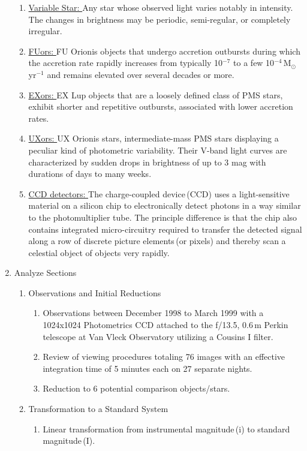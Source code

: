 \documentclass[twocolumn]{aastex6}
\begin{document}
\begin{enumerate}
\begin{enumerate}
		    \item \underline{Variable Star: } Any star whose observed light varies notably in intensity. The changes in brightness may be periodic, semi-regular, or completely irregular.
		    \item \underline{FUors: } FU Orionis objects that undergo accretion outbursts during which the accretion rate rapidly increases from typically 10$^{-7}$ to a few 10$^{-4}$\,M$_{\odot}$yr$^{-1}$ and remains elevated over several decades or more.\,\cite{2}
		    \item \underline{EXors: } EX Lup objects that are a loosely defined class of PMS stars, exhibit shorter and repetitive outbursts, associated with lower accretion rates.\,\cite{2}
		    \item \underline{UXors: } UX Orionis stars, intermediate-mass PMS stars displaying a peculiar kind of photometric variability. Their V-band light curves are characterized by sudden drops in brightness of up to 3 mag with durations of days to many weeks.\,\cite{1}
		    \item \underline{CCD detectors: } The charge-coupled device\,(CCD) uses a light-sensitive material on a silicon chip to electronically detect photons in a way similar to the photomultiplier tube. The principle difference is that the chip also contains integrated micro-circuitry required to transfer the detected signal along a row of discrete picture elements\,(or pixels) and thereby scan a celestial object of objects very rapidly.
		\end{enumerate}	
	\item Analyze Sections
		\begin{enumerate}
			\item Observations and Initial Reductions
				\begin{enumerate}
					\item Observations between December 1998 to March 1999 with a 1024x1024 Photometrics CCD attached to the f/13.5, 0.6\,m Perkin telescope at Van Vleck Observatory utilizing a Cousins I filter.
					\item Review of viewing procedures totaling 76 images with an effective integration time of 5 minutes each on 27 separate nights.
					\item Reduction to 6 potential comparison objects/stars.
				\end{enumerate}
			\item Transformation to a Standard System
				\begin{enumerate}
					\item Linear transformation from instrumental magnitude\,(i) to standard magnitude\,(I).

\end{enumerate}
\end{enumerate}
\end{enumerate}
\end{document}
